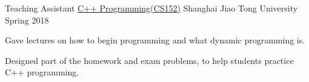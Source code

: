 \begin{cventries}
    \cventry
    {Teaching Assistant}
	{\href{https://acm.sjtu.edu.cn/wiki/Programming_2017}{C++ Programming(CS152)}}
	{Shanghai Jiao Tong University}
	{Spring 2018}
	{\begin{cvitems}
        \item {Gave lectures on how to begin programming and what dynamic programming is.}
        \item {Designed part of the homework and exam problems, to help students practice C++ programming}.
    \end{cvitems}}
\end{cventries}